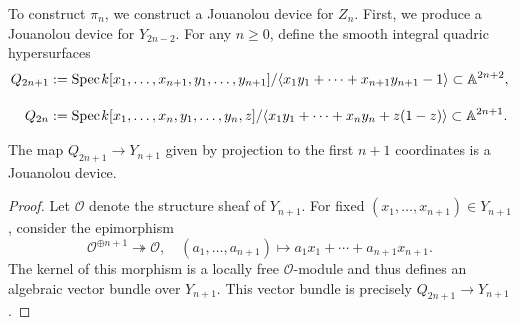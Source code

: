 To construct $\pi_n$, we construct a Jouanolou device for $Z_n$. First, we produce a Jouanolou device for $Y_{2n-2}$. For any $n \geq 0$, define the smooth integral quadric hypersurfaces
    \begin{align*}
        Q_{2n+1} &:= \text{Spec}\hspace{0.1em} k[x_1,\ldots,x_{n+1},y_1,\ldots,y_{n+1}]/\langle x_1y_1 + \cdots + x_{n+1}y_{n+1}- 1\rangle \subset \mathbb{A}^{2n+2}, \\[10pt]
        Q_{2n} &:= \text{Spec}\hspace{0.1em} k[x_1,\ldots,x_n,y_1,\ldots,y_n,z]/\langle x_1y_1 + \cdots + x_ny_n + z(1-z)\rangle \subset \mathbb{A}^{2n+1}. 
\end{align*}

\begin{proposition}\cite[Lemma 2.8]{LERBET2024109415} 
    The map $Q_{2n+1} \to Y_{n+1}$ given by projection to the first $n+1$ coordinates is a Jouanolou device.
\end{proposition}

\begin{proof}
    Let $\mathcal{O}$ denote the structure sheaf of $Y_{n+1}$. For fixed $(x_1,\ldots,x_{n+1}) \in Y_{n+1}$, consider the epimorphism
    \[
    \mathcal{O}^{\oplus n+1} \twoheadrightarrow \mathcal{O}, \quad (a_1,\ldots,a_{n+1}) \mapsto 
    a_1x_1 + \cdots + a_{n+1}x_{n+1}.\] The kernel of this morphism is a locally free $\mathcal{O}$-module and thus defines an algebraic vector bundle over $Y_{n+1}$. This vector bundle is precisely $Q_{2n+1} \to Y_{n+1}$.
\end{proof}

